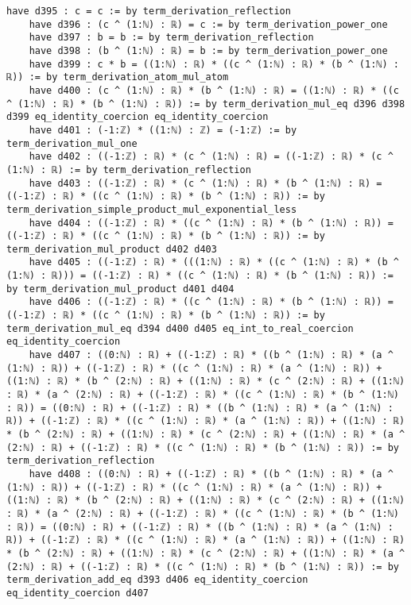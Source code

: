 \documentclass{article}
\begin{document}
\begin{tcolorbox}[colback=white!10, width=\linewidth]
\begin{lstlisting}[language=Lean4]
    have d395 : c = c := by term_derivation_reflection
    have d396 : (c ^ (1:ℕ) : ℝ) = c := by term_derivation_power_one
    have d397 : b = b := by term_derivation_reflection
    have d398 : (b ^ (1:ℕ) : ℝ) = b := by term_derivation_power_one
    have d399 : c * b = ((1:ℕ) : ℝ) * ((c ^ (1:ℕ) : ℝ) * (b ^ (1:ℕ) : ℝ)) := by term_derivation_atom_mul_atom
    have d400 : (c ^ (1:ℕ) : ℝ) * (b ^ (1:ℕ) : ℝ) = ((1:ℕ) : ℝ) * ((c ^ (1:ℕ) : ℝ) * (b ^ (1:ℕ) : ℝ)) := by term_derivation_mul_eq d396 d398 d399 eq_identity_coercion eq_identity_coercion
    have d401 : (-1:ℤ) * ((1:ℕ) : ℤ) = (-1:ℤ) := by term_derivation_mul_one
    have d402 : ((-1:ℤ) : ℝ) * (c ^ (1:ℕ) : ℝ) = ((-1:ℤ) : ℝ) * (c ^ (1:ℕ) : ℝ) := by term_derivation_reflection
    have d403 : ((-1:ℤ) : ℝ) * (c ^ (1:ℕ) : ℝ) * (b ^ (1:ℕ) : ℝ) = ((-1:ℤ) : ℝ) * ((c ^ (1:ℕ) : ℝ) * (b ^ (1:ℕ) : ℝ)) := by term_derivation_simple_product_mul_exponential_less
    have d404 : ((-1:ℤ) : ℝ) * ((c ^ (1:ℕ) : ℝ) * (b ^ (1:ℕ) : ℝ)) = ((-1:ℤ) : ℝ) * ((c ^ (1:ℕ) : ℝ) * (b ^ (1:ℕ) : ℝ)) := by term_derivation_mul_product d402 d403
    have d405 : ((-1:ℤ) : ℝ) * (((1:ℕ) : ℝ) * ((c ^ (1:ℕ) : ℝ) * (b ^ (1:ℕ) : ℝ))) = ((-1:ℤ) : ℝ) * ((c ^ (1:ℕ) : ℝ) * (b ^ (1:ℕ) : ℝ)) := by term_derivation_mul_product d401 d404
    have d406 : ((-1:ℤ) : ℝ) * ((c ^ (1:ℕ) : ℝ) * (b ^ (1:ℕ) : ℝ)) = ((-1:ℤ) : ℝ) * ((c ^ (1:ℕ) : ℝ) * (b ^ (1:ℕ) : ℝ)) := by term_derivation_mul_eq d394 d400 d405 eq_int_to_real_coercion eq_identity_coercion
    have d407 : ((0:ℕ) : ℝ) + ((-1:ℤ) : ℝ) * ((b ^ (1:ℕ) : ℝ) * (a ^ (1:ℕ) : ℝ)) + ((-1:ℤ) : ℝ) * ((c ^ (1:ℕ) : ℝ) * (a ^ (1:ℕ) : ℝ)) + ((1:ℕ) : ℝ) * (b ^ (2:ℕ) : ℝ) + ((1:ℕ) : ℝ) * (c ^ (2:ℕ) : ℝ) + ((1:ℕ) : ℝ) * (a ^ (2:ℕ) : ℝ) + ((-1:ℤ) : ℝ) * ((c ^ (1:ℕ) : ℝ) * (b ^ (1:ℕ) : ℝ)) = ((0:ℕ) : ℝ) + ((-1:ℤ) : ℝ) * ((b ^ (1:ℕ) : ℝ) * (a ^ (1:ℕ) : ℝ)) + ((-1:ℤ) : ℝ) * ((c ^ (1:ℕ) : ℝ) * (a ^ (1:ℕ) : ℝ)) + ((1:ℕ) : ℝ) * (b ^ (2:ℕ) : ℝ) + ((1:ℕ) : ℝ) * (c ^ (2:ℕ) : ℝ) + ((1:ℕ) : ℝ) * (a ^ (2:ℕ) : ℝ) + ((-1:ℤ) : ℝ) * ((c ^ (1:ℕ) : ℝ) * (b ^ (1:ℕ) : ℝ)) := by term_derivation_reflection
    have d408 : ((0:ℕ) : ℝ) + ((-1:ℤ) : ℝ) * ((b ^ (1:ℕ) : ℝ) * (a ^ (1:ℕ) : ℝ)) + ((-1:ℤ) : ℝ) * ((c ^ (1:ℕ) : ℝ) * (a ^ (1:ℕ) : ℝ)) + ((1:ℕ) : ℝ) * (b ^ (2:ℕ) : ℝ) + ((1:ℕ) : ℝ) * (c ^ (2:ℕ) : ℝ) + ((1:ℕ) : ℝ) * (a ^ (2:ℕ) : ℝ) + ((-1:ℤ) : ℝ) * ((c ^ (1:ℕ) : ℝ) * (b ^ (1:ℕ) : ℝ)) = ((0:ℕ) : ℝ) + ((-1:ℤ) : ℝ) * ((b ^ (1:ℕ) : ℝ) * (a ^ (1:ℕ) : ℝ)) + ((-1:ℤ) : ℝ) * ((c ^ (1:ℕ) : ℝ) * (a ^ (1:ℕ) : ℝ)) + ((1:ℕ) : ℝ) * (b ^ (2:ℕ) : ℝ) + ((1:ℕ) : ℝ) * (c ^ (2:ℕ) : ℝ) + ((1:ℕ) : ℝ) * (a ^ (2:ℕ) : ℝ) + ((-1:ℤ) : ℝ) * ((c ^ (1:ℕ) : ℝ) * (b ^ (1:ℕ) : ℝ)) := by term_derivation_add_eq d393 d406 eq_identity_coercion eq_identity_coercion d407

\end{lstlisting}
\end{tcolorbox}
\end{document}
